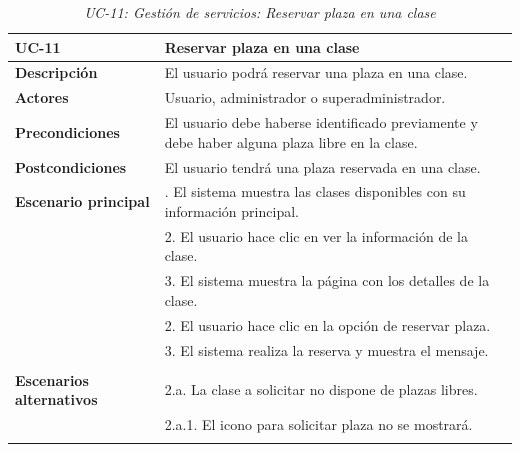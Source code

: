 \begin{table}[H]
  \begin{center}
    \begin{tabularx}{16.4cm}{|l|X|}
      \hline
      \textbf{UC-11} & \textbf{Reservar plaza en una clase}\\
      \hline
      \textbf{Descripción} & El usuario podrá reservar una plaza en una clase.\\
      \hline
      \textbf{Actores} & Usuario, administrador o superadministrador.\\
      \hline
      \textbf{Precondiciones} & El usuario debe haberse identificado previamente y debe haber alguna plaza libre en la clase.\\
      \hline
      \textbf{Postcondiciones} & El usuario tendrá una plaza reservada en una clase.\\
      \hline
      \textbf{Escenario principal} & \smallskip 1. El sistema muestra las clases disponibles con su información principal.\\
      & 2. El usuario hace clic en ver la información de la clase.\\
      & 3. El sistema muestra la página con los detalles de la clase.\\
      & 2. El usuario hace clic en la opción de reservar plaza.\\
      & 3. El sistema realiza la reserva y muestra el mensaje.\\
      & \\
      \hline
      \textbf{Escenarios alternativos} & \smallskip 2.a. La clase a solicitar no dispone de plazas libres.\\
      & \hspace{0.3cm} 2.a.1. El icono para solicitar plaza no se mostrará. \\
      & \\
      \hline
    \end{tabularx}
    \caption{\textit{UC-11: Gestión de servicios: Reservar plaza en una clase}}
    \label{tab:CU-reservar-clase}
  \end{center}
\end{table}


